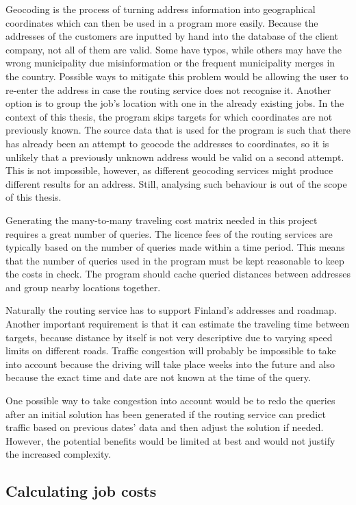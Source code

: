 Geocoding is the process of turning address information into geographical coordinates which can then be used in a program more easily. Because the addresses of the customers are inputted by hand into the database of the client company, not all of them are valid. Some have typos, while others may have the wrong municipality due misinformation or the frequent municipality merges in the country. Possible ways to mitigate this problem would be allowing the user to re-enter the address in case the routing service does not recognise it. Another option is to group the job's location with one in the already existing jobs. In the context of this thesis, the program skips targets for which coordinates are not previously known. The source data that is used for the program is such that there has already been an attempt to geocode the addresses to coordinates, so it is unlikely that a previously unknown address would be valid on a second attempt. This is not impossible, however, as different geocoding services might produce different results for an address. Still, analysing such behaviour is out of the scope of this thesis. 

Generating the many-to-many traveling cost matrix needed in this project requires a great number of queries. The licence fees of the routing services are typically based on the number of queries made within a time period. This means that the number of queries used in the program must be kept reasonable to keep the costs in check. The program should cache queried distances between addresses and group nearby locations together. 

Naturally the routing service has to support Finland's addresses and roadmap. Another important requirement is that it can estimate the traveling time between targets, because distance by itself is not very descriptive due to varying speed limits on different roads. Traffic congestion will probably be impossible to take into account because the driving will take place weeks into the future and also because the exact time and date are not known at the time of the query. 

One possible way to take congestion into account would be to redo the queries after an initial solution has been generated if the routing service can predict traffic based on previous dates' data and then adjust the solution if needed. However, the potential benefits would be limited at best and would not justify the increased complexity.


\subsection{Calculating job costs}

